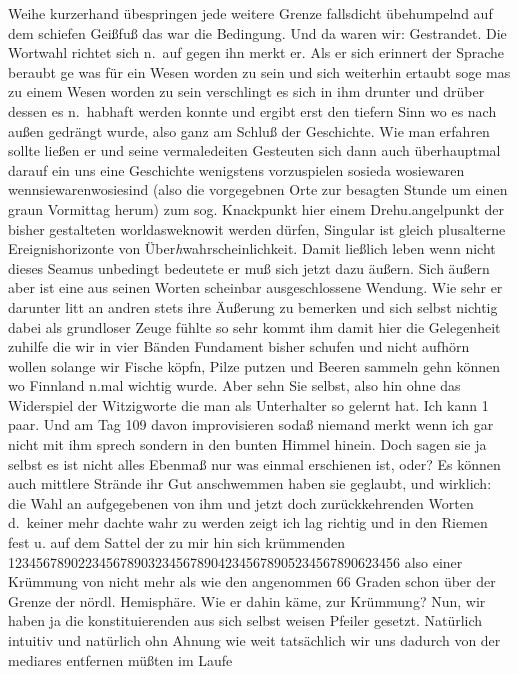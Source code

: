 \documentclass[
]{article}
\begin{document}
Weihe kurzerhand übespringen jede weitere Grenze fallsdicht übehumpelnd
auf dem schiefen Geißfuß das war die Bedingung. Und da waren wir:
Gestrandet. Die Wortwahl richtet sich n.~auf gegen ihn merkt er. Als er
sich erinnert der Sprache beraubt ge\textquotesingle{} was für ein Wesen
worden zu sein und sich weiterhin ertaubt soge \textquotesingle mas zu
einem Wesen worden zu sein verschlingt es sich in ihm drunter und drüber
dessen es n.~habhaft werden konnte und ergibt erst den tiefern Sinn wo
es nach außen gedrängt wurde, also ganz am Schluß der Geschichte. Wie
man erfahren sollte ließen er und seine vermaledeiten Gesteuten sich
dann auch überhauptmal darauf ein uns eine Geschichte wenigstens
vorzuspielen sosieda wosiewaren wennsiewarenwosiesind (also die
vorgegebnen Orte zur besagten Stunde um einen graun Vormittag herum) zum
sog. Knackpunkt hier einem Dreh\textquotesingle u.angelpunkt der bisher
gestalteten worldasweknowit werden dürfen, Singular ist gleich
plusalterne Ereignishorizonte von Über\emph{h}wahrscheinlichkeit. Damit
ließlich leben wenn nicht dieses Seamus unbedingt bedeutete er muß sich
jetzt dazu äußern. Sich äußern aber ist eine aus seinen Worten scheinbar
ausgeschlossene Wendung. Wie sehr er darunter litt an andren stets ihre
Äußerung zu bemerken und sich selbst nichtig dabei als grundloser Zeuge
fühlte so sehr kommt ihm damit hier die Gelegenheit zuhilfe die wir in
vier Bänden Fundament bisher schufen und nicht aufhörn wollen solange
wir Fische köpfn, Pilze putzen und Beeren sammeln gehn können wo
Finnland n.mal wichtig wurde. Aber sehn Sie selbst, also hin ohne das
Widerspiel der Witzigworte die man als Unterhalter so gelernt hat. Ich
kann 1 paar. Und am Tag 109 davon improvisieren sodaß niemand merkt wenn
ich gar nicht mit ihm sprech sondern in den bunten Himmel hinein. Doch
sagen sie ja selbst es ist nicht alles Ebenmaß nur was einmal erschienen
ist, oder? Es können auch mittlere Strände ihr Gut anschwemmen haben sie
geglaubt, und wirklich: die Wahl an aufgegebenen von ihm und jetzt doch
zurückkehrenden Worten d.~keiner mehr dachte wahr zu werden zeigt ich
lag richtig und in den Riemen fest u. auf dem Sattel der zu mir hin sich
krümmenden 12345678902234567890323456789042345678905234567890623456 also
einer Krümmung von nicht mehr als wie den angenommen 66 Graden schon
über der Grenze der nördl. Hemisphäre. Wie er dahin käme, zur Krümmung?
Nun, wir haben ja die konstituierenden aus sich selbst weisen Pfeiler
gesetzt. Natürlich intuitiv und natürlich ohn Ahnung wie weit
tatsächlich wir uns dadurch von der mediares entfernen müßten im Laufe
\end{document}
